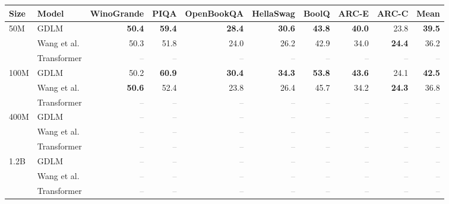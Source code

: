\begin{tabular}{llrrrrrrrr}
\toprule
Size & Model & WinoGrande & PIQA & OpenBookQA & HellaSwag & BoolQ & ARC-E & ARC-C & Mean \\
\midrule
50M & GDLM & \textbf{50.4} & \textbf{59.4} & \textbf{28.4} & \textbf{30.6} & \textbf{43.8} & \textbf{40.0} & 23.8 & \textbf{39.5} \\
 & Wang et al. & 50.3 & 51.8 & 24.0 & 26.2 & 42.9 & 34.0 & \textbf{24.4} & 36.2 \\
 & Transformer & \textcolor{gray}{--} & \textcolor{gray}{--} & \textcolor{gray}{--} & \textcolor{gray}{--} & \textcolor{gray}{--} & \textcolor{gray}{--} & \textcolor{gray}{--} & \textcolor{gray}{--} \\
\midrule
100M & GDLM & 50.2 & \textbf{60.9} & \textbf{30.4} & \textbf{34.3} & \textbf{53.8} & \textbf{43.6} & 24.1 & \textbf{42.5} \\
 & Wang et al. & \textbf{50.6} & 52.4 & 23.8 & 26.4 & 45.7 & 34.2 & \textbf{24.3} & 36.8 \\
 & Transformer & \textcolor{gray}{--} & \textcolor{gray}{--} & \textcolor{gray}{--} & \textcolor{gray}{--} & \textcolor{gray}{--} & \textcolor{gray}{--} & \textcolor{gray}{--} & \textcolor{gray}{--} \\
\midrule
400M & GDLM & \textcolor{gray}{--} & \textcolor{gray}{--} & \textcolor{gray}{--} & \textcolor{gray}{--} & \textcolor{gray}{--} & \textcolor{gray}{--} & \textcolor{gray}{--} & \textcolor{gray}{--} \\
 & Wang et al. & \textcolor{gray}{--} & \textcolor{gray}{--} & \textcolor{gray}{--} & \textcolor{gray}{--} & \textcolor{gray}{--} & \textcolor{gray}{--} & \textcolor{gray}{--} & \textcolor{gray}{--} \\
 & Transformer & \textcolor{gray}{--} & \textcolor{gray}{--} & \textcolor{gray}{--} & \textcolor{gray}{--} & \textcolor{gray}{--} & \textcolor{gray}{--} & \textcolor{gray}{--} & \textcolor{gray}{--} \\
\midrule
1.2B & GDLM & \textcolor{gray}{--} & \textcolor{gray}{--} & \textcolor{gray}{--} & \textcolor{gray}{--} & \textcolor{gray}{--} & \textcolor{gray}{--} & \textcolor{gray}{--} & \textcolor{gray}{--} \\
 & Wang et al. & \textcolor{gray}{--} & \textcolor{gray}{--} & \textcolor{gray}{--} & \textcolor{gray}{--} & \textcolor{gray}{--} & \textcolor{gray}{--} & \textcolor{gray}{--} & \textcolor{gray}{--} \\
 & Transformer & \textcolor{gray}{--} & \textcolor{gray}{--} & \textcolor{gray}{--} & \textcolor{gray}{--} & \textcolor{gray}{--} & \textcolor{gray}{--} & \textcolor{gray}{--} & \textcolor{gray}{--} \\
\bottomrule
\end{tabular}
